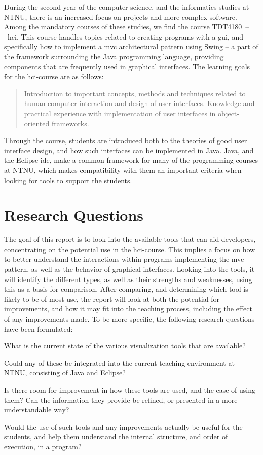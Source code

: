 During the second year of the computer science, and the informatics studies at NTNU, there is an increased focus on projects and more complex software.
Among the mandatory courses of these studies, we find the course TDT4180~--~\gls{hci}.
This course handles topics related to creating programs with a \gls{gui}, and specifically how to implement a \gls{mvc} architectural pattern using Swing -- a part of the framework surrounding the Java programming language, providing components that are frequently used in graphical interfaces.
The learning goals for the \gls{hci}-course are as follows:
\begin{quote}
Introduction to important concepts, methods and techniques related to human-computer interaction and design of user interfaces.
Knowledge and practical experience with implementation of user interfaces in object-oriented frameworks.
\end{quote}
Through the course, students are introduced both to the theories of good user interface design, and how such interfaces can be implemented in Java.
Java, and the Eclipse \gls{ide}, make a common framework for many of the programming courses at NTNU, which makes compatibility with them an important criteria when looking for tools to support the students.

\section{Research Questions}\label{intro-RQs}

The goal of this report is to look into the available tools that can aid developers, concentrating on the potential use in the \gls{hci}-course.
This implies a focus on how to better understand the interactions within programs implementing the \gls{mvc} pattern, as well as the behavior of graphical interfaces.
Looking into the tools, it will identify the different types, as well as their strengths and weaknesses, using this as a basis for comparison.
After comparing, and determining which tool is likely to be of most use, the report will look at both the potential for improvements, and how it may fit into the teaching process, including the effect of any improvements made.
To be more specific, the following research questions have been formulated:
\begin{theorem}
What is the current state of the various visualization tools that are available?
\end{theorem}
\begin{theorem}
Could any of these be integrated into the current teaching environment at NTNU, consisting of Java and Eclipse? %
\end{theorem}
\begin{theorem}
Is there room for improvement in how these tools are used, and the ease of using them? Can the information they provide be refined, or presented in a more understandable way? %
\end{theorem}
\begin{theorem}
Would the use of such tools and any improvements actually be useful for the students, and help them understand the internal structure, and order of execution, in a program?%
\end{theorem}
